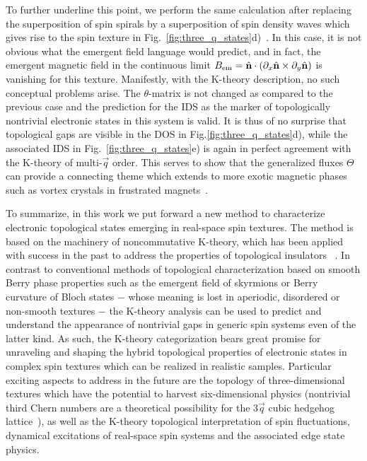 \documentclass[
    aps,
    prl,
    twocolumn,
    floatfix,
    superscriptaddress
]{revtex4-2}
\newcommand{\SupplementalMaterial}{\cite{Note1}}
\begin{document}
To further underline this point, we perform the same calculation after replacing the superposition of spin spirals by a superposition of spin density waves which gives rise to the spin texture in Fig.~\ref{fig:three_q_states}d)~\SupplementalMaterial. 
In this case, it is not obvious what the emergent field language would predict, and  
in fact, the emergent magnetic field in the continuous limit  $B_\mathrm{em} = \hat{\mathbf{n}} \cdot(\partial_x \hat{\mathbf{n}} \times \partial_y \hat{\mathbf{n}})$ is vanishing for this texture.
Manifestly, with the K-theory description, no such conceptual problems arise.
The $\theta$-matrix is not changed as compared to the previous case and the prediction for the IDS as the marker of topologically nontrivial electronic states in this system is valid. 
It is thus of no surprise that topological gaps are visible in the DOS in Fig.\ref{fig:three_q_states}d), while the associated IDS in Fig.~\ref{fig:three_q_states}e) is again in perfect agreement with the K-theory of multi-$\vec{q}$ order.
This serves to show that the generalized fluxes $\Theta$ can provide a connecting theme which extends to more exotic magnetic phases such as vortex crystals in frustrated magnets~\cite{Wang2015}.


To summarize, in this work we put forward a new method to characterize electronic topological states emerging in real-space spin textures. 
The method is based on the machinery of noncommutative K-theory, which has been applied with success in the past to  address the  properties of topological insulators ~\cite{Kitaev2009, Budich2013}. 
In contrast to conventional methods of topological characterization based on smooth Berry phase properties such as the emergent field of skyrmions or Berry curvature of Bloch states $-$ whose meaning is lost in aperiodic, disordered or non-smooth textures $-$ the K-theory analysis can be used to predict and understand the appearance of nontrivial gaps in generic spin systems even of the latter kind. 
As such, the K-theory categorization bears great promise for unraveling and shaping the hybrid topological properties of electronic states in complex spin textures which can be realized in realistic samples. 
Particular exciting aspects to address in the future are the topology of three-dimensional textures which have the potential to harvest six-dimensional physics (nontrivial third Chern numbers are a theoretical possibility for the 3$\vec{q}$ cubic hedgehog lattice~\SupplementalMaterial), as well as the K-theory topological interpretation of spin fluctuations, dynamical excitations of real-space spin systems and the associated edge state physics.
\end{document}
